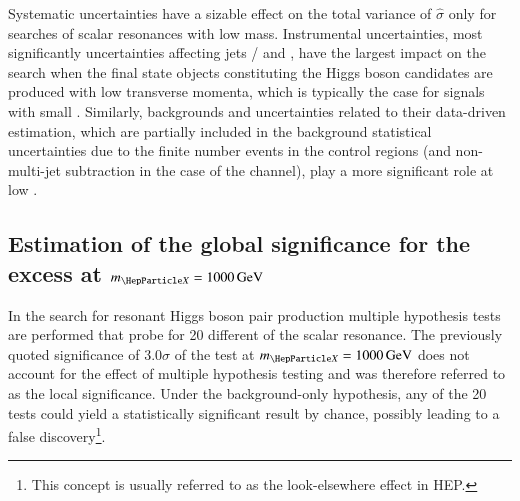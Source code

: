 Systematic uncertainties have a sizable effect on the total variance
of $\hat{\sigma}$ only for searches of scalar resonances with low
mass. Instrumental uncertainties, most significantly uncertainties
affecting jets / \pTmissAbs and \tauhadvis, have the largest impact on
the search when the final state objects constituting the Higgs boson
candidates are produced with low transverse momenta, which is
typically the case for signals with small \mX. Similarly,
\faketauhadvis backgrounds and uncertainties related to their
data-driven estimation, which are partially included in the background
statistical uncertainties due to the finite number events in the
control regions (and non-multi-jet subtraction in the case of the
\hadhad channel), play a more significant role at low \mX.




\subsection{Estimation of the global significance for the excess at
  $\mX = \SI{1000}{\GeV}$}%
\label{sec:global_significance}


In the search for resonant Higgs boson pair production multiple
hypothesis tests are performed that probe for 20 different \mX of the
scalar resonance. The previously quoted significance of $3.0\sigma$ of
the test at $\mX = \SI{1000}{\GeV}$ does not account for the effect of
multiple hypothesis testing and was therefore referred to as the local
significance. Under the background-only hypothesis, any of the 20
tests could yield a statistically significant result by chance,
possibly leading to a false discovery\footnote{This concept is usually
  referred to as the look-elsewhere effect in HEP.}.

